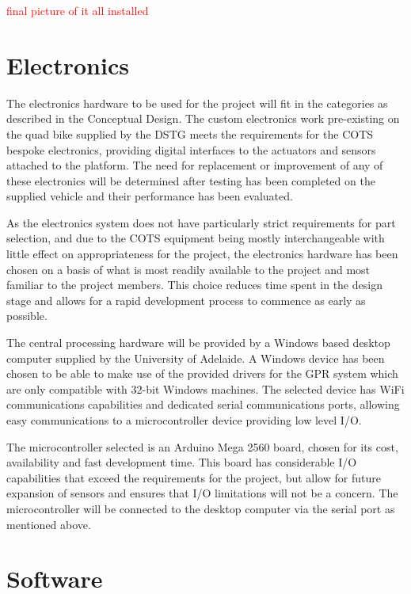 \documentclass[main.tex]{subfiles}
\begin{document}
\textcolor{red}{final picture of it all installed }  

\section{Electronics}
The electronics hardware to be used for the project will fit in the categories as described in the Conceptual Design. The custom electronics work pre-existing on the quad bike supplied by the DSTG meets the requirements for the COTS bespoke electronics, providing digital interfaces to the actuators and sensors attached to the platform. The need for replacement or improvement of any of these electronics will be determined after testing has been completed on the supplied vehicle and their performance has been evaluated.

As the electronics system does not have particularly strict requirements for part selection, and due to the COTS equipment being mostly interchangeable with little effect on appropriateness for the project, the electronics hardware has been chosen on a basis of what is most readily available to the project and most familiar to the project members. This choice reduces time spent in the design stage and allows for a rapid development process to commence as early as possible.

The central processing hardware will be provided by a Windows based desktop computer supplied by the University of Adelaide. A Windows device has been chosen to be able to make use of the provided drivers for the GPR system which are only compatible with 32-bit Windows machines. The selected device has WiFi communications capabilities and dedicated serial communications ports, allowing easy communications to a microcontroller device providing low level I/O.

The microcontroller selected is an Arduino Mega 2560 board, chosen for its cost, availability and fast development time. This board has considerable I/O capabilities that exceed the requirements for the project, but allow for future expansion of sensors and ensures that I/O limitations will not be a concern. The microcontroller will be connected to the desktop computer via the serial port as mentioned above.

\section{Software}
\end{document}
